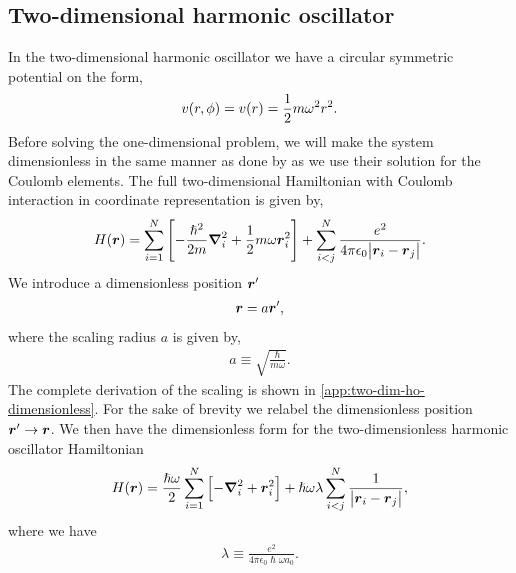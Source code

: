     \subsection{Two-dimensional harmonic oscillator}
        \label{subsec:two-dim-ho}
        In the two-dimensional harmonic oscillator we have a circular symmetric
        potential on the form,
        \begin{align}
            v(r, \phi) = v(r) = \frac{1}{2} m \omega^2 r^2.
        \end{align}
        Before solving the one-dimensional problem, we will make the system
        dimensionless in the same manner as done by
        \citeauthor{anisimovas1998energy} \cite{anisimovas1998energy} as we use
        their solution for the Coulomb elements.
        The full two-dimensional Hamiltonian with Coulomb interaction in
        coordinate representation is given by,
        \begin{align}
            H(\boldsymbol{r})
            = \sum_{i = 1}^{N} \left[ 
                -\frac{\hslash^2}{2m} \boldsymbol{\nabla}^2_i
                + \frac{1}{2} m \omega \boldsymbol{r}^2_i
             \right]
            + \sum_{i < j}^{N}
            \frac{e^2}{4\pi \epsilon_0 \abs{\boldsymbol{r}_i - \boldsymbol{r}_j}}.
            \label{eq:two-dim-ho-hamiltonian}
        \end{align}
        We introduce a dimensionless position $\boldsymbol{r}'$
        \begin{align}
            \boldsymbol{r} = a \boldsymbol{r}',
        \end{align}
        where the scaling radius $a$ is given by,
        \begin{align}
            a \equiv \sqrt{\frac{\hslash}{m\omega}}.
            \label{eq:bohr-radius}
        \end{align}
        The complete derivation of the scaling is shown in
        \autoref{app:two-dim-ho-dimensionless}.
        For the sake of brevity we relabel the dimensionless position $\boldsymbol{r}'
        \to \boldsymbol{r}$.
        We then have the dimensionless form for the two-dimensionless harmonic
        oscillator Hamiltonian
        \begin{align}
            H(\boldsymbol{r})
            = \frac{\hslash\omega}{2} \sum_{i = 1}^{N}\left[ 
                -\boldsymbol{\nabla}^2_i
                + \boldsymbol{r}^2_i
             \right]
            + \hslash\omega\lambda
            \sum_{i < j}^{N}
            \frac{1}{\abs{\boldsymbol{r}_i - \boldsymbol{r}_j}},
        \end{align}
        where we have
        \begin{align}
            \lambda \equiv \frac{e^2}{
                4\pi \epsilon_0 \hslash \omega a_0
            }.
            \label{eq:two-dim-ho-lambda}
        \end{align}
